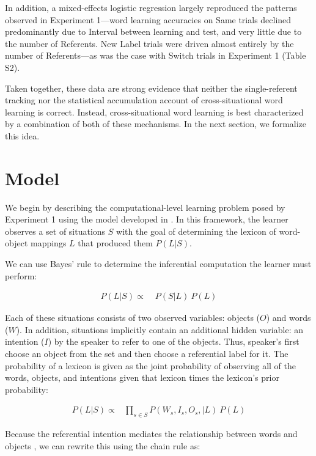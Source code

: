 \documentclass{pnastwo}
\begin{document}
\begin{article}
In addition, a mixed-effects logistic regression largely reproduced the patterns observed in Experiment 1---word learning accuracies on Same trials declined predominantly due to Interval between learning and test, and very little due to the number of Referents. New Label trials were driven almost entirely by the number of Referents---as was the case with Switch trials in Experiment 1 (Table S2).

Taken together, these data are strong evidence that neither the single-referent tracking nor the statistical accumulation account of cross-situational word learning is correct. Instead, cross-situational word learning is best characterized by a combination of both of these mechanisms. In the next section, we formalize this idea.

\section{Model}

We begin by describing the computational-level learning problem posed by Experiment 1 using the model developed in \citep{Frank2009a}. In this framework, the learner observes a set of situations $S$ with the goal of determining the lexicon of word-object mappings $L$ that produced them $P(L|S)$. 

We can use Bayes' rule to determine the inferential computation the learner must perform: 

\begin{align} 
P(L|S) \propto & \;P(S|L) \: P(L) \label{eq:wurwur1}
\end{align}

\noindent Each of these situations consists of two observed variables: objects ($O$) and words ($W$). In addition, situations implicitly contain an additional hidden variable: an intention ($I$) by the speaker to refer to one of the objects. Thus, speaker's first choose an object from the set and then choose a referential label for it. The probability of a lexicon is given as the joint probability of observing all of the words, objects, and intentions given that lexicon times the lexicon's prior probability:

\begin{align}
P(L|S) \propto & \prod\limits_{s\in{S}}P(W_{s},I_{s}, O_{s},|L) \: P(L) \label{eq:wurwur2}
\end{align}

\noindent Because the referential intention mediates the relationship between words and objects \citep{Frank2009a}, we can rewrite this using the chain rule as:


\end{article}
\end{document}
